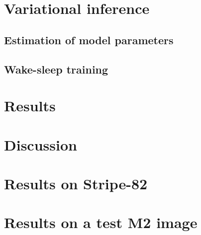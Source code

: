 \documentclass[12pt]{article}
\begin{document}
\section{Variational inference}
\label{sec:var_inference}


\subsection{Estimation of model parameters}
\label{sec:model_params}


\subsection{Wake-sleep training}
\label{sec:wake_sleep}


% 

\section{Results}
\label{sec:results}




\section{Discussion}
\label{sec:discussion}





\appendix
\section{Results on Stripe-82}


\section{Results on a test M2 image}



\end{document}
